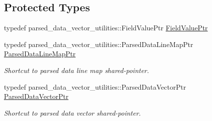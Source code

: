 \subsection*{Protected Types}
\begin{DoxyCompactItemize}
\item 
typedef parsed\+\_\+data\+\_\+vector\+\_\+utilities\+::\+Field\+Value\+Ptr \hyperlink{classtudat_1_1input__output_1_1Extractor_a50e09f32d40315fbc58b482561bf5317}{Field\+Value\+Ptr}
\item 
typedef parsed\+\_\+data\+\_\+vector\+\_\+utilities\+::\+Parsed\+Data\+Line\+Map\+Ptr \hyperlink{classtudat_1_1input__output_1_1Extractor_abfff04b61512a08b822cbcecb6613253}{Parsed\+Data\+Line\+Map\+Ptr}\hypertarget{classtudat_1_1input__output_1_1Extractor_abfff04b61512a08b822cbcecb6613253}{}\label{classtudat_1_1input__output_1_1Extractor_abfff04b61512a08b822cbcecb6613253}

\begin{DoxyCompactList}\small\item\em Shortcut to parsed data line map shared-\/pointer. \end{DoxyCompactList}\item 
typedef parsed\+\_\+data\+\_\+vector\+\_\+utilities\+::\+Parsed\+Data\+Vector\+Ptr \hyperlink{classtudat_1_1input__output_1_1Extractor_a4ef13b59802f0a183cca98df67f01fed}{Parsed\+Data\+Vector\+Ptr}\hypertarget{classtudat_1_1input__output_1_1Extractor_a4ef13b59802f0a183cca98df67f01fed}{}\label{classtudat_1_1input__output_1_1Extractor_a4ef13b59802f0a183cca98df67f01fed}

\begin{DoxyCompactList}\small\item\em Shortcut to parsed data vector shared-\/pointer. \end{DoxyCompactList}\end{DoxyCompactItemize}
